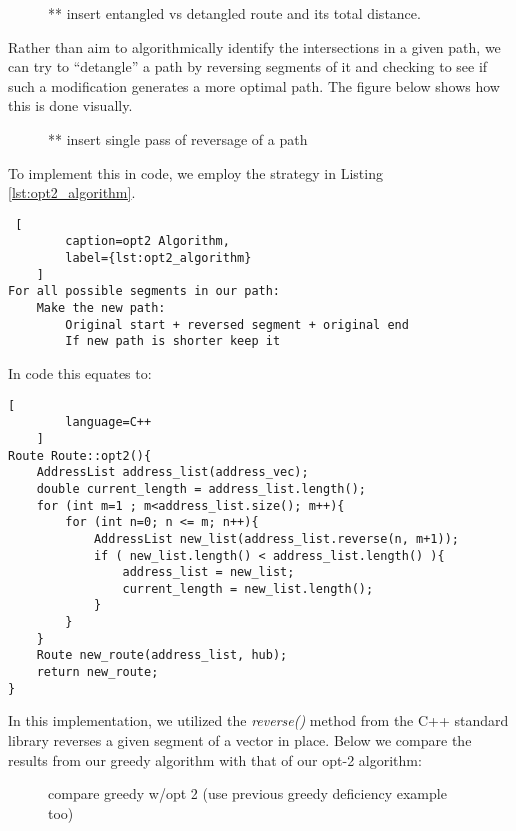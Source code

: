 \documentclass[letterpaper]{article}
\begin{document}
    \begin{figure}[h]
        \caption{ ** insert entangled vs detangled route and its total distance. }
    \end{figure}

    Rather than aim to algorithmically identify the intersections in a given path, 
    we can try to “detangle” a path by reversing segments of it and checking to 
    see if such a modification generates a more optimal path. The figure below 
    shows how this is done visually.

    \begin{figure}[h]
        \caption{ ** insert single pass of reversage of a path }
    \end{figure}

    To implement this in code, we employ the strategy in Listing \ref{lst:opt2_algorithm}.

    \begin{lstlisting} [
        caption=opt2 Algorithm,
        label={lst:opt2_algorithm}
    ]
For all possible segments in our path:
    Make the new path:
        Original start + reversed segment + original end 
        If new path is shorter keep it\end{lstlisting}

    In code this equates to:
    \begin{lstlisting}[
        language=C++
    ]
Route Route::opt2(){
    AddressList address_list(address_vec);
    double current_length = address_list.length();
    for (int m=1 ; m<address_list.size(); m++){
        for (int n=0; n <= m; n++){
            AddressList new_list(address_list.reverse(n, m+1));
            if ( new_list.length() < address_list.length() ){        
                address_list = new_list;
                current_length = new_list.length();
            } 
        }
    }
    Route new_route(address_list, hub);
    return new_route;
}
\end{lstlisting}

    In this implementation, we utilized the \emph{reverse()} method 
    from the C++ standard library reverses a given segment of a vector 
    in place. Below we compare the results from our greedy algorithm 
    with that of our opt-2 algorithm:

    \begin{figure}[h]
        \caption{compare greedy w/opt 2 
        (use previous greedy deficiency example too)}
    \end{figure}
\end{document}
